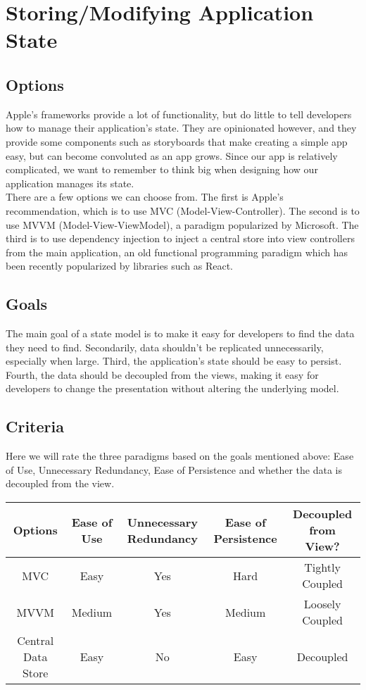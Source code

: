 \documentclass[letterpaper,10pt,titlepage]{article}
\begin{document}
\section{Storing/Modifying Application State}
\subsection{Options}
Apple's frameworks provide a lot of functionality, but do little to tell developers how to manage their application's state. They are opinionated however, and they provide some components such as storyboards that make creating a simple app easy, but can become convoluted as an app grows. Since our app is relatively complicated, we want to remember to think big when designing how our application manages its state.\\

There are a few options we can choose from. The first is Apple's recommendation, which is to use MVC (Model-View-Controller). The second is to use MVVM  (Model-View-ViewModel), a paradigm popularized by Microsoft. The third is to use dependency injection to inject a central store into view controllers from the main application, an old functional programming paradigm which has been recently popularized by libraries such as React.

\subsection{Goals}
The main goal of a state model is to make it easy for developers to find the data they need to find. Secondarily, data shouldn't be replicated unnecessarily, especially when large. Third, the application's state should be easy to persist. Fourth, the data should be decoupled from the views, making it easy for developers to change the presentation without altering the underlying model.

\subsection{Criteria}
Here we will rate the three paradigms based on the goals mentioned above: Ease of Use, Unnecessary Redundancy, Ease of Persistence and whether the data is decoupled from the view.
\begin{center}
\begin{tabular}{ |c|c|c|c|c| }
 \hline
 Options & Ease of Use & Unnecessary Redundancy & Ease of Persistence & Decoupled from View? \\ \hline
 MVC & Easy & Yes & Hard & Tightly Coupled \\ \hline
 MVVM & Medium & Yes & Medium & Loosely Coupled \\ \hline
 Central Data Store & Easy & No & Easy & Decoupled \\
 \hline
\end{tabular}
\end{center}
\end{document}
